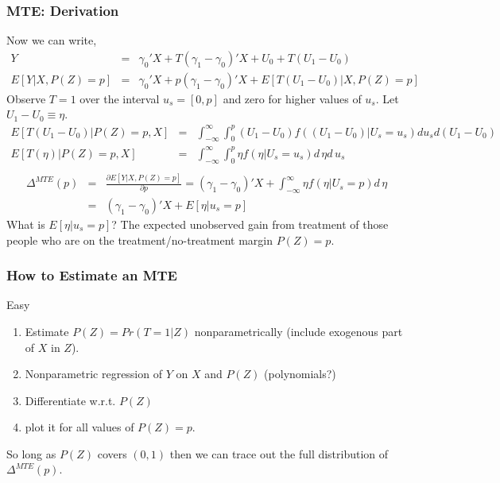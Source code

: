 \documentclass[xcolor=pdftex,dvipsnames,table,mathserif]{beamer}
\begin{document}
\begin{frame}
\frametitle{MTE: Derivation}
\footnotesize
Now we can write,
\begin{eqnarray*}
Y &=& \gamma_0' X + T(\gamma_1 - \gamma_0)' X + U_0 + T(U_1 - U_0)\\
E[Y| X,P(Z)=p] &=& \gamma_0' X + p(\gamma_1 - \gamma_0)'X + E[T(U_1 - U_0)|X,P(Z)=p]
\end{eqnarray*}
Observe $T=1$ over the interval $u_s = [0,p]$ and zero for higher values of $u_s$. Let $U_1-U_0 \equiv \eta$.
\begin{eqnarray*}
E[T(U_1 - U_0) | P(Z) =p,X] &=& \int_{-\infty}^{\infty} \int_{0}^{p} (U_1 - U_0) f((U_1-U_0) | U_s = u_s) d u_s d(U_1 -U_0)\\
E[T(\eta) | P(Z) =p,X] &=& \int_{-\infty}^{\infty} \int_{0}^{p} \eta f(\eta | U_s = u_s)  d\, \eta d\, u_s\\
\end{eqnarray*}
\begin{eqnarray*}
\Delta^{MTE}(p) &=& \frac{\partial E[Y | X, P(Z)=p]}{\partial p} = (\gamma_1 - \gamma_0)'X + \int_{-\infty}^{\infty} \eta f(\eta | U_s =p) d\, \eta\\
&=& (\gamma_1 - \gamma_0)'X + E[\eta | u_s =p]
\end{eqnarray*}
What is $E[\eta | u_s =p]$? The expected unobserved gain from treatment of those people who are on the treatment/no-treatment margin $P(Z)=p$.
\end{frame}

\begin{frame}
\frametitle{How to Estimate an MTE}
Easy
\begin{enumerate}
\item Estimate $P(Z) = Pr(T=1 | Z)$ nonparametrically (include exogenous part of $X$ in $Z$).
\item Nonparametric regression of $Y$ on $X$ and $P(Z)$ (polynomials?)
\item Differentiate w.r.t. $P(Z)$
\item plot it for all values of $P(Z)=p$.
\end{enumerate}
So long as $P(Z)$ covers $(0,1)$ then we can trace out the full distribution of $\Delta^{MTE}(p)$.
\end{frame}
\end{document}
